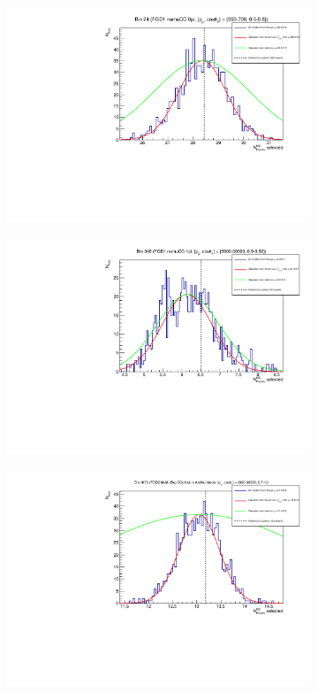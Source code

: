 \begin{figure}[h]
	\begin{subfigure}[t]{0.32\textwidth}
		\includegraphics[width=\textwidth,page=1, trim={0mm 0mm 0mm 0mm}, clip]{figures/det/fgd1_numu_0pi_good}
	\end{subfigure}
	\begin{subfigure}[t]{0.32\textwidth}
		\includegraphics[width=\textwidth,page=1, trim={0mm 0mm 0mm 0mm}, clip]{figures/det/fgd1_numu_1pi_good}
	\end{subfigure}
	\begin{subfigure}[t]{0.32\textwidth}
		\includegraphics[width=\textwidth,page=1, trim={0mm 0mm 0mm 0mm}, clip]{figures/det/fgd2_numubkg_ccoth_good}

\end{subfigure}
\end{figure}
